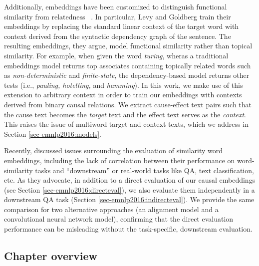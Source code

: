 Additionally, embeddings have been customized to distinguish functional similarity from relatedness ~\citep{levy2014dependency,kielaspecializing}.
In particular, Levy and Goldberg train their embeddings by replacing the standard linear context of the target word with context derived from the syntactic dependency graph of the sentence.  The resulting embeddings, they argue, model functional similarity rather than topical similarity.  For example, when given the word \emph{turing}, wheras a traditional embeddings model returns top associates containing topically related words such as \emph{non-deterministic} and \emph{finite-state}, the dependency-based model returns other tests (i.e., \emph{pauling, hotelling,} and \emph{hamming}).
In this work, we make use of this extension to arbitrary context in order to train our embeddings with contexts derived from binary causal relations.  We extract cause-effect text pairs such that the cause text becomes the \emph{target} text and the effect text serves as the \emph{context}. This raises the issue of multiword target and context texts, which we address in Section \ref{sec-emnlp2016:models}.

Recently, \citet{faruqui2016problems} discussed issues surrounding the evaluation of similarity word embeddings, including the lack of correlation between their performance on word-similarity tasks and ``downstream'' or real-world tasks like QA, text classification, etc.  As they advocate, in addition to a direct evaluation of our causal embeddings (see Section \ref{sec-emnlp2016:directeval}), we also evaluate them independently in a downstream QA task (Section \ref{sec-emnlp2016:indirecteval}).  We provide the same comparison for two alternative approaches (an alignment model and a convolutional neural network model), confirming that the direct evaluation performance can be misleading without the task-specific, downstream evaluation.

\subsection{Chapter overview}

